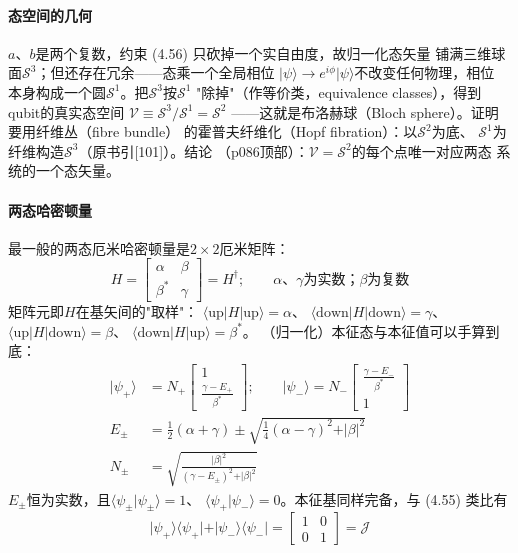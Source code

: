 \paragraph{态空间的几何}
$a$、$b$是两个复数，约束 (4.56) 只砍掉一个实自由度，故归一化态矢量
铺满三维球面$\mathcal{S}^{3}$；但还存在冗余——态乘一个全局相位
$\vert\psi\rangle\to e^{i\phi}\vert\psi\rangle$不改变任何物理，相位
本身构成一个圆$\mathcal{S}^{1}$。把$\mathcal{S}^{3}$按$\mathcal{S}^{1}$
"除掉"（作等价类，equivalence classes），得到qubit的真实态空间
$\mathcal{V}\equiv\mathcal{S}^{3}/\mathcal{S}^{1}=\mathcal{S}^{2}$
——这就是布洛赫球（Bloch sphere）。证明要用纤维丛（fibre bundle）
的霍普夫纤维化（Hopf fibration）：以$\mathcal{S}^{2}$为底、
$\mathcal{S}^{1}$为纤维构造$\mathcal{S}^{3}$（原书引[101]）。结论
（p086顶部）：$\mathcal{V}=\mathcal{S}^{2}$的每个点唯一对应两态
系统的一个态矢量。

\paragraph{两态哈密顿量}
最一般的两态厄米哈密顿量是$2\times2$厄米矩阵：
\begin{equation*}
H=\begin{bmatrix}\alpha & \beta\\ \beta^{*} & \gamma\end{bmatrix}
=H^{\dagger};\qquad \text{$\alpha$、$\gamma$为实数；$\beta$为复数}
\tag{4.57}
\end{equation*}
矩阵元即$H$在基矢间的"取样"：
$\langle\mathrm{up}\vert H\vert\mathrm{up}\rangle=\alpha$、
$\langle\mathrm{down}\vert H\vert\mathrm{down}\rangle=\gamma$、
$\langle\mathrm{up}\vert H\vert\mathrm{down}\rangle=\beta$、
$\langle\mathrm{down}\vert H\vert\mathrm{up}\rangle=\beta^{*}$。
（归一化）本征态与本征值可以手算到底：
\begin{align*}
\vert\psi_{+}\rangle&=N_{+}\begin{bmatrix}1\\[2pt]\frac{\gamma-E_{+}}{\beta^{*}}\end{bmatrix};
\qquad
\vert\psi_{-}\rangle=N_{-}\begin{bmatrix}\frac{\gamma-E_{-}}{\beta^{*}}\\[2pt]1\end{bmatrix}\\
E_{\pm}&=\frac{1}{2}(\alpha+\gamma)\pm\sqrt{\frac{1}{4}(\alpha-\gamma)^{2}+\vert\beta\vert^{2}}\\
N_{\pm}&=\sqrt{\frac{\vert\beta\vert^{2}}{(\gamma-E_{\pm})^{2}+\vert\beta\vert^{2}}}
\end{align*}
$E_{\pm}$恒为实数，且$\langle\psi_{\pm}\vert\psi_{\pm}\rangle=1$、
$\langle\psi_{+}\vert\psi_{-}\rangle=0$。本征基同样完备，与
(4.55) 类比有
\begin{equation*}
\vert\psi_{+}\rangle\langle\psi_{+}\vert+\vert\psi_{-}\rangle
\langle\psi_{-}\vert=\begin{bmatrix}1&0\\0&1\end{bmatrix}=\mathcal{J}
\tag{4.58}
\end{equation*}

